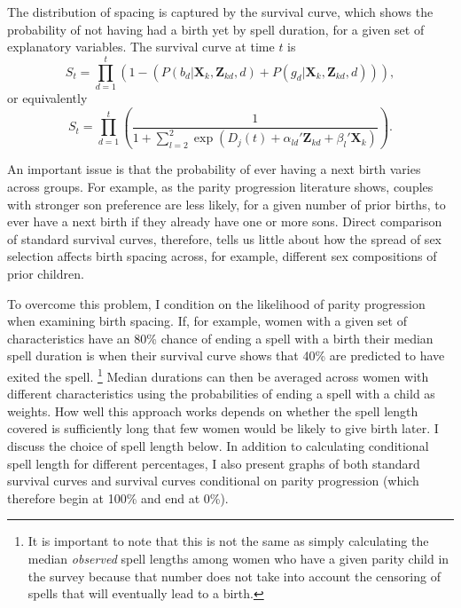 \documentclass[12pt,letterpaper]{article}
\begin{document}
The distribution of spacing is captured by the survival curve, which shows 
the probability of not having had a birth yet by spell duration, for
a given set of explanatory variables.
The survival curve at time $t$ is 
\begin{equation}
S_{t} 
= 
\prod_{d=1}^t 
\left( 
	1- \left(P(b_{d} | \mathbf{X}_{k}, \mathbf{Z}_{kd}, d) 
	+ P(g_{d} | \mathbf{X}_{k}, \mathbf{Z}_{kd}, d) \right) 
\right),
 \label{eq:survival}
\end{equation}
or equivalently
\begin{equation}
S_{t} 
= 
\prod_{d=1}^t
\left(
\frac{ 1 }
{1 + \sum_{l=2}^2 \exp(D_j(t) + \alpha_{ld}'\mathbf{Z}_{kd} + \beta_l'\mathbf{X}_{k})}
\right).
\end{equation}

An important issue is that the probability of ever having a next birth varies 
across groups.
For example, as the parity progression literature shows, couples with stronger 
son preference are less likely, for a given number of prior births, to ever have 
a next birth if they already have one or more sons.
Direct comparison of standard survival curves, therefore, tells us little 
about how the spread of sex selection affects birth spacing across, for
example, different sex compositions of prior children.

To overcome this problem, I condition on the likelihood of parity progression 
when examining birth spacing.
If, for example, women with a given set of characteristics have an 80\%
chance of ending a spell with a birth their median spell duration is when
their survival curve shows that 40\% are predicted to have exited the spell.%
\footnote{
It is important to note that this is not the same as simply calculating 
the median \emph{observed} spell lengths among women who have a given 
parity child in the survey because that number does not take into account
the censoring of spells that will eventually lead to a birth.
}
Median durations can then be averaged across women with different 
characteristics using the probabilities of ending a spell with a child
as weights.
How well this approach works depends on whether the spell length covered is 
sufficiently long that few women would be likely to give birth later.
I discuss the choice of spell length below.
In addition to calculating conditional spell length for different 
percentages, I also present graphs of both standard survival curves and
survival curves conditional on parity progression (which therefore
begin at 100\% and end at 0\%).
\end{document}
